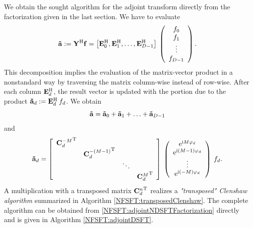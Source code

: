 We obtain the sought algorithm for the adjoint transform directly from the factorization given in the last section. We have to evaluate
$$
  \mathbf{\tilde{a}}
  :=
  \mathbf{Y}^{\text{\rm{H}}} \mathbf{f}
  = 
  \left[
    \mathbf{E}_{0}^{\text{\rm{H}}},
    \mathbf{E}_{1}^{\text{\rm{H}}},
    \ldots,
    \mathbf{E}_{D-1}^{\text{\rm{H}}}
  \right]
  \:
  \left(\begin{array}{c}
    f_{0}\\
    f_{1}\\
    \vdots\\
    f_{D-1}
  \end{array}\right). 
$$
This decomposition implies the evaluation of the matrix-vector product in a nonstandard way by traversing the 
matrix column-wise instead of row-wise. After each column $\mathbf{E}_{d}^{\text{\rm{H}}}$, the result vector is updated with the portion due 
to the product $\mathbf{\tilde{a}}_{d} := \mathbf{E}^{\text{\rm{H}}}_{d} \: f_{d}$. We obtain
\begin{equation}
  \nonumber
  \mathbf{\tilde{a}} = \mathbf{\tilde{a}}_{0} + \mathbf{\tilde{a}}_{1} + \ldots + \mathbf{\tilde{a}}_{D-1}
\end{equation}
and
\begin{equation}
  \label{NFSFT:adjointNDSFTFactorization}
  \mathbf{\tilde{a}}_{d}
  =
  \left[\begin{array}{cccc}
    {\mathbf{C}^{-M}_{d}}^{\text{\rm{T}}} &                               &        &                           \\
                              & {\mathbf{C}^{-(M-1)}_{d}}^{\text{\rm{T}}} &        &                           \\
                              &                                & \ddots &                           \\
                              &                                &        & {\mathbf{C}^{M}_{d}}^{\text{\rm{T}}} 
  \end{array}\right]
  \:
  \left(\begin{array}{c}
    \mbox{\rm{e}}^{\mbox{\scriptsize\rm{i}} M \varphi_{d}}\\
    \mbox{\rm{e}}^{\mbox{\scriptsize\rm{i}} (M-1) \varphi_{d}}\\
    \vdots\\
    \mbox{\rm{e}}^{\mbox{\scriptsize\rm{i}} (-M) \varphi_{d}}
  \end{array}\right)
  \:
  f_{d}.
\end{equation}
A multiplication with a transposed matrix ${\mathbf{C}^{n}_{d}}^{\text{\rm{T}}}$ realizes a \emph{"transposed" Clenshaw algorithm} summarized in Algorithm \ref{NFSFT:transposedClenshaw}. The complete algorithm can be obtained from \eqref{NFSFT:adjointNDSFTFactorization} directly and is given in Algorithm \ref{NFSFT:adjointDSFT}.
